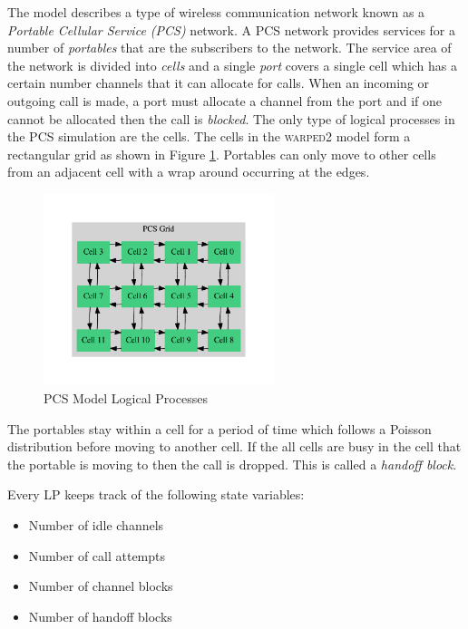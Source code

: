 \documentclass[11pt]{book}
\begin{document}
The model describes a type of wireless communication network known as a \emph{Portable Cellular
  Service (PCS)} network.  A PCS network provides services for a number of \emph{portables} that are
the subscribers to the network.  The service area of the network is divided into \emph{cells} and a
single \emph{port} covers a single cell which has a certain number channels that it can allocate for
calls.  When an incoming or outgoing call is made, a port must allocate a channel from the port and
if one cannot be allocated then the call is \emph{blocked}\cite{lin-96b}.  The only type of logical
processes in the PCS simulation are the cells.  The cells in the \textsc{warped2} model form a
rectangular grid as shown in Figure \ref{pcs_model_lps}.  Portables can only move to other cells
from an adjacent cell with a wrap around occurring at the edges.

\begin{figure}
    \centering
    \includegraphics[width=0.6\textwidth,quiet]{figs/graphviz/pcs_model.pdf}
    \caption{PCS Model Logical Processes}\label{pcs_model_lps}
\end{figure}

The portables stay within a cell for a period of time which follows a Poisson distribution
before moving to another cell.  If the all cells are busy in the cell that the portable
is moving to then the call is dropped.  This is called a \emph{handoff block}.

Every LP keeps track of the following state variables:
\begin{itemize}
    \item Number of idle channels
    \item Number of call attempts
    \item Number of channel blocks
    \item Number of handoff blocks
\end{itemize}
\end{document}
